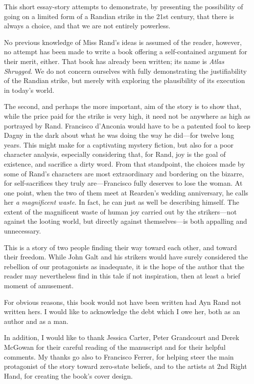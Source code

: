 This short essay-story attempts to demonstrate, by presenting the possibility of going on a limited form of a Randian strike in the 21st century, that there is always a choice, and that we are not entirely powerless.

No previous knowledge of Miss Rand's ideas is assumed of the reader, however, no attempt has been made to write a book offering a self-contained argument for their merit, either. That book has already been written; its name is \emph{Atlas Shrugged}. We do not concern ourselves with fully demonstrating the justifiability of the Randian strike, but merely with exploring the plausibility of its execution in today's world.

The second, and perhaps the more important, aim of the story is to show that, while the price paid for the strike is very high, it need not be anywhere as high as portrayed by Rand. Francisco d'Anconia would have to be a patented fool to keep Dagny in the dark about what he was doing the way he did---for twelve long years. This might make for a captivating mystery fiction, but also for a poor character analysis, especially considering that, for Rand, joy is the goal of existence, and sacrifice a dirty word. From that standpoint, the choices made by some of Rand's characters are most extraordinary and bordering on the bizarre, for self-sacrifices they truly are---Francisco fully deserves to lose the woman. At one point, when the two of them meet at Rearden's wedding anniversary, he calls her \emph{a magnificent waste}. In fact, he can just as well be describing himself. The extent of the magnificent waste of human joy carried out by the strikers---not against the looting world, but directly against themselves---is both appalling and unnecessary.

This is a story of two people finding their way toward each other, and toward their freedom. While John Galt and his strikers would have surely considered the rebellion of our protagonists as inadequate, it is the hope of the author that the reader may nevertheless find in this tale if not inspiration, then at least a brief moment of amusement.

For obvious reasons, this book would not have been written had Ayn Rand not written hers. I would like to acknowledge the debt which I owe her, both as an author and as a man.

In addition, I would like to thank Jessica Carter, Peter Grandcourt and Derek McGowan for their careful reading of the manuscript and for their helpful comments. My thanks go also to Francisco Ferrer, for helping steer the main protagonist of the story toward zero-state beliefs, and to the artists at 2nd Right Hand, for creating the book's cover design.

